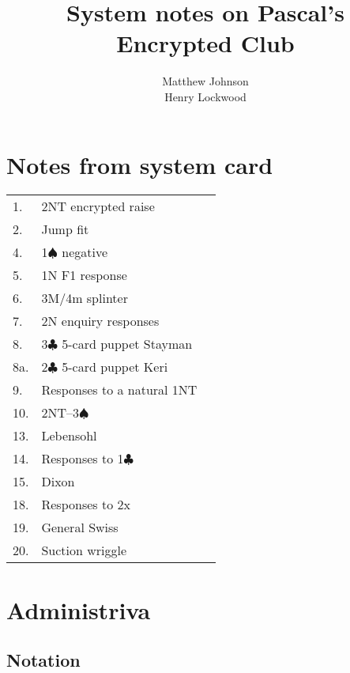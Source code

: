 \documentclass[a4paper,14pt]{extarticle}
\author{Matthew Johnson\\Henry Lockwood}
\title{System notes on Pascal's Encrypted Club}
\begin{document}
\newcommand{\orange}[1]{[OB #1]}
\newcommand{\xref}[1]{[\ref{#1}]}

\maketitle
\tableofcontents

\section*{Notes from system card}
\begin{tabular*}{\textwidth}{ll@{\extracolsep{\fill}}r}
1. & 2NT encrypted raise & \pageref{note:1} \\
2. & Jump fit & \pageref{note:2} \\
4. & 1$\spadesuit$ negative & \pageref{note:4} \\
5. & 1N F1 response & \pageref{note:5} \\
6. & 3M/4m splinter & \pageref{note:6} \\
7. & 2N enquiry responses & \pageref{note:7} \\
8. & 3$\clubsuit$ 5-card puppet Stayman & \pageref{note:8} \\
8a. & 2$\clubsuit$ 5-card puppet Keri & \pageref{note:8a} \\
9. & Responses to a natural 1NT & \pageref{note:9} \\
10. & 2NT--3$\spadesuit$ & \pageref{note:8} \\
13. & Lebensohl & \pageref{note:13} \\
14. & Responses to 1$\clubsuit$ & \pageref{note:14} \\
15. & Dixon & \pageref{note:15} \\
18. & Responses to 2x & \pageref{note:18} \\
19. & General Swiss & \pageref{note:19} \\
20. & Suction wriggle & \pageref{note:20} \\
\end{tabular*}

\newpage

\section{Administriva}
\label{sec:admin}

\subsection{Notation}
\label{sec:notation}
\end{document}
